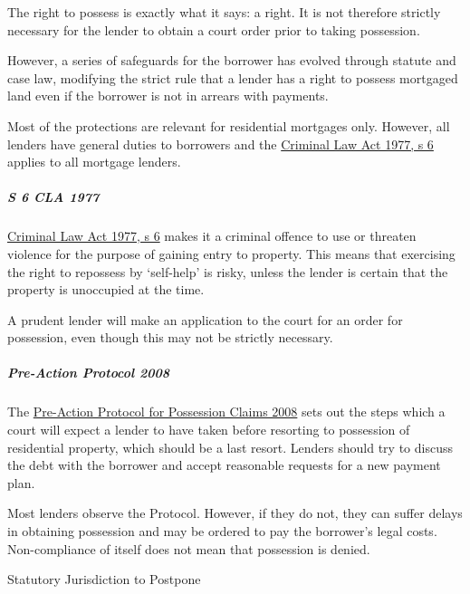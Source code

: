 \documentclass[
]{article}
\begin{document}
The right to possess is exactly what it says: a right. It is not
therefore strictly necessary for the lender to obtain a court order
prior to taking possession.

However, a series of safeguards for the borrower has evolved through
statute and case law, modifying the strict rule that a lender has a
right to possess mortgaged land even if the borrower is not in arrears
with payments.

Most of the protections are relevant for residential mortgages only.
However, all lenders have general duties to borrowers and the
\href{https://www.legislation.gov.uk/ukpga/1977/45/section/6}{Criminal
Law Act 1977, s 6} applies to all mortgage lenders.

\hypertarget{s-6-cla-1977}{%
\subparagraph{S 6 CLA 1977}\label{s-6-cla-1977}}

\href{https://www.legislation.gov.uk/ukpga/1977/45/section/6}{Criminal
Law Act 1977, s 6} makes it a criminal offence to use or threaten
violence for the purpose of gaining entry to property. This means that
exercising the right to repossess by `self-help' is risky, unless the
lender is certain that the property is unoccupied at the time.

A prudent lender will make an application to the court for an order for
possession, even though this may not be strictly necessary.

\hypertarget{pre-action-protocol-2008}{%
\subparagraph{Pre-Action Protocol 2008}\label{pre-action-protocol-2008}}

The
\href{https://www.justice.gov.uk/courts/procedure-rules/civil/protocol/prot_mha}{Pre-Action
Protocol for Possession Claims 2008} sets out the steps which a court
will expect a lender to have taken before resorting to possession of
residential property, which should be a last resort. Lenders should try
to discuss the debt with the borrower and accept reasonable requests for
a new payment plan.

Most lenders observe the Protocol. However, if they do not, they can
suffer delays in obtaining possession and may be ordered to pay the
borrower's legal costs. Non-compliance of itself does not mean that
possession is denied.

Statutory Jurisdiction to Postpone
\end{document}
